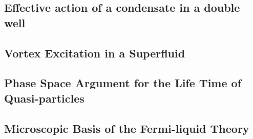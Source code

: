 \subsection{Effective action of a condensate in a double well}

\subsection{Vortex Excitation in a Superfluid}


% 

% 



\newpage
\setcounter{section}{9}
\setcounter{subsection}{0}
\subsection{Phase Space Argument for the Life Time of Quasi-particles}

\subsection{Microscopic Basis of the Fermi-liquid Theory}



% 






